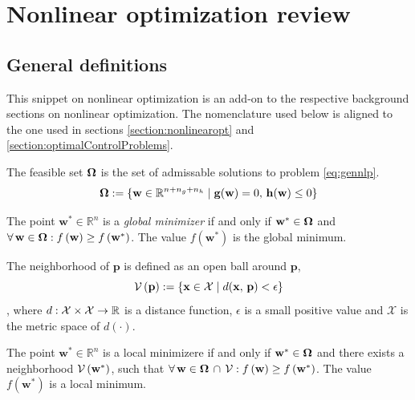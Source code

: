 \chapter{Nonlinear optimization review}
\label{chapter:nlpsnippet}

\section{General definitions}
\label{section:gendefinitions}

This snippet on nonlinear optimization is an add-on to the respective background sections on nonlinear optimization. The nomenclature used below is aligned to the one used in sections \ref{section:nonlinearopt} and \ref{section:optimalControlProblems}.

\begin{definition}
The feasible set $\feasibleSet$ is the set of admissable solutions to problem \ref{eq:gennlp}.
\begin{equation}
\feasibleSet := \{ \mathbf{w} \in \mathbb{R}^{n + n_g + n_h} \mid \mathbf{g}(\mathbf{w}) = 0,\, \mathbf{h}(\mathbf{w}) \leq 0 \}
\end{equation}
\end{definition}

\begin{definition}
The point $\mathbf{w}^* \in \mathbb{R}^n$ is a \textit{global minimizer} if and only if $\mathbf{w}^* \in \feasibleSet$ and $\forall \, \mathbf{w} \in \feasibleSet:f\left(\mathbf{w}\right) \geq f\left(\mathbf{w}^*\right)$. The value $f\left(\mathbf{w}^*\right)$ is the global minimum.
\label{def:globalmin}
\end{definition}

\begin{definition}
The neighborhood of $\mathbf{p}$ is defined as an open ball around $\mathbf{p}$,
\begin{equation}
\mathcal{V}\left( \mathbf{p} \right) := \{\mathbf{x} \in \mathcal{X} \mid d(\mathbf{x},\, \mathbf{p}) < \epsilon \}
\label{eq:neighborhood}
\end{equation}
\noindent, where $d:\mathcal{X} \times \mathcal{X} \to \mathbb{R}$ is a distance function, $\epsilon$ is a small positive value and $\mathcal{X}$ is the metric space of $d(\cdot)$.
\end{definition}

\begin{definition}
The point $\mathbf{w}^* \in \mathbb{R}^n$ is a local minimizere if and only if $\mathbf{w}^* \in \feasibleSet$ and there exists a neighborhood $\mathcal{V}\left(\mathbf{w}^*\right)$, such that $\forall \, \mathbf{w} \in \feasibleSet \, \cap \, \neighborhood:f\left(\mathbf{w}\right) \geq f\left(\mathbf{w}^*\right)$. The value $f\left(\mathbf{w}^*\right)$ is a local minimum.
 \label{def:localmin}
\end{definition}

